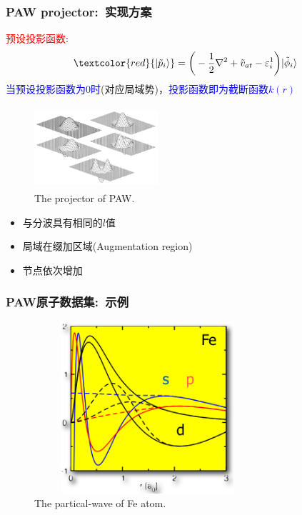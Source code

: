 \frame
{
	\frametitle{\textrm{PAW projector}:~实现方案}
	\textcolor{red}{预设投影函数}:$$\textcolor{red}{|\tilde p_i\rangle}=\bigg(-\dfrac12\nabla^2+\tilde v_{at}-\varepsilon_i^1\bigg)|\tilde\phi_i\rangle$$
	\textcolor{blue}{当预设投影函数为0时}(对应局域势)，\textcolor{blue}{投影函数即为截断函数$k(r)$}
\begin{minipage}[t]{0.52\linewidth}
\begin{figure}[h!]
\centering
\vspace*{-0.30in}
\includegraphics[height=1.2in,width=1.8in,viewport=0 0 1100 745,clip]{Figures/PAW_projector-2.png}
\caption{\tiny \textrm{The projector of PAW.}}%
\label{PAW_projector}
\end{figure}
\end{minipage}
\hfill
\begin{minipage}[t]{0.43\linewidth}
\begin{itemize}
	\item 与分波具有相同的$l$值
	\item 局域在缀加区域(\textrm{Augmentation region})
	\item 节点依次增加
\end{itemize}
\end{minipage}
	\fontsize{7.2pt}{5.2pt}
}

\frame
{
	\frametitle{\textrm{PAW}原子数据集:~示例}
\begin{figure}[h!]
\centering
\includegraphics[height=2.5in,width=3.3in,viewport=0 0 570 545,clip]{Figures/PAW-partical.png}
\caption{\tiny \textrm{The partical-wave of Fe atom.}}%
\label{PAW_partical_Fe}
\end{figure}
}

